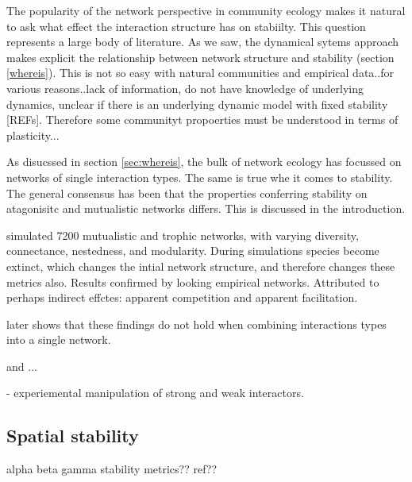 The popularity of the network perspective in community ecology makes it natural to ask what effect the interaction structure has on stabiilty. This question represents a large body of literature. As we saw, the dynamical sytems approach makes explicit the relationship between network structure and stability (section \ref{whereis}). This is not so easy with natural communities and empirical data..for various reasons..lack of information, do not have knowledge of underlying dynamics, unclear if there is an underlying dynamic model with fixed stability [REFs]. Therefore some communityt propoerties must be understood in terms of plasticity...  

As disucssed in section \ref{sec:whereis}, the bulk of network ecology has focussed on networks of single interaction types. The same is true whe it comes to stability. The general consensus has been that the properties conferring stability on atagonisitc and mutualistic networks differs. This is discussed in the introduction. 

\cite{thebault2010stability} simulated 7200 mutualistic and trophic networks, with varying diversity, connectance, nestedness, and modularity. During simulations species become extinct, which changes the intial network structure, and therefore changes these metrics also. Results confirmed by looking empirical networks. Attributed to perhaps indirect effctes: apparent competition and apparent facilitation.    

\cite{sauve2014structure} later shows that these findings do not hold when combining interactions types into a single network. 

\cite{mougi2012diversity} and \cite{lurgi2015effects} ...

\cite{o2009perturbations} - experiemental manipulation of strong and weak interactors.

\subsection{Spatial stability}

alpha beta gamma stability metrics?? ref??

%
%

